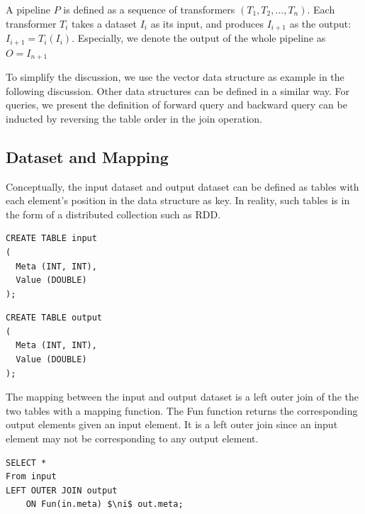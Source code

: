 \documentclass{sig-alternate}
\begin{document}
A pipeline $P$ is defined as a sequence of transformers $(T_1, T_2, ..., T_n)$. 
Each transformer $T_i$ takes a dataset $I_i$ as its input, and produces $I_{i+1}$ as the output: 
$I_{i+1} = T_i(I_i)$. 
Especially, we denote the output of the whole pipeline as $O = I_{n+1}$

To simplify the discussion, we use the vector data structure as example in the following discussion.
Other data structures can be defined in a similar way. 
For queries, we present the definition of forward query and backward query can be inducted by reversing
the table order in the join operation.

\subsection{Dataset and Mapping}
\label{sec:formal-ds-mapping}
Conceptually, the input dataset and output dataset can be defined
as tables with each element's position in the data structure as key.
In reality, such tables is in the form of a distributed collection such as RDD.
\newline\newline
\noindent\begin{minipage}{\textwidth}
\noindent\begin{minipage}{.2\textwidth}
\begin{verbatim}
CREATE TABLE input
(
  Meta (INT, INT),
  Value (DOUBLE)
);
\end{verbatim}
\end{minipage} 
\qquad{\color{black}\vrule}\qquad
\begin{minipage}{.2\textwidth}
\begin{verbatim}
CREATE TABLE output
(
  Meta (INT, INT),
  Value (DOUBLE)
);
\end{verbatim}
\end{minipage}
\end{minipage}
\vspace{2ex}

The mapping between the input and output dataset is a left outer join of the the two tables with a mapping function.
The Fun function returns the corresponding output elements given an input element. 
It is a left outer join since an input element may not be corresponding to any output element.
\begin{lstlisting}
SELECT *
From input
LEFT OUTER JOIN output 
    ON Fun(in.meta) $\ni$ out.meta;
\end{lstlisting}
\end{document}
